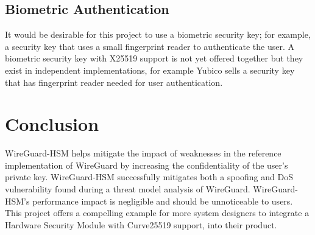 \documentclass [11pt, proquest] {uwthesis}[2020/02/24]
\begin{document}
\subsection{Biometric Authentication}
It would be desirable for this project to use a biometric security key; for example, a security key that uses a small fingerprint reader to authenticate the user. A biometric security key with X25519 support is not yet offered together but they exist in independent implementations, for example Yubico sells a security key that has fingerprint reader needed for user authentication\cite{yubico_yubikey_2022}. 

\section{Conclusion}
WireGuard-HSM helps mitigate the impact of weaknesses in the reference implementation of WireGuard by increasing the confidentiality of the user's private key. WireGuard-HSM successfully mitigates both a spoofing and DoS vulnerability found during a threat model analysis of WireGuard.
WireGuard-HSM's performance impact is negligible and should be unnoticeable to users.
This project offers a compelling example for more system designers to integrate a Hardware Security Module with Curve25519 support, into their product.





\appendix
\end{document}

